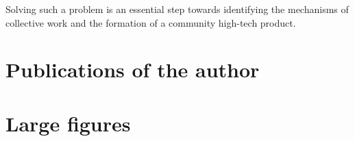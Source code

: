 \documentclass[12pt]{report}
\theoremstyle{definition}
\begin{document}
Solving such a problem is an essential step towards identifying the mechanisms of collective work and the formation of a community high-tech product.

\printbibliography

\part*{Publications of the author}

\begin{refsection}[authorpapersVAK]
	\nocite{*}
	\printbibliography[title={Publication in HAC editions.}]
\end{refsection}

\begin{refsection}[authorsvid]
	\nocite{*}
	\printbibliography[title={Patents.}]
\end{refsection}

\begin{refsection}[authorconferences]
	\nocite{*}
	\printbibliography[title={Proceedings.}]
\end{refsection}

\begin{refsection}[authorpapers]
	\nocite{*}
	\printbibliography[title={Publications in peer-reviewed journals.}]
\end{refsection}



\appendix

\part*{Large figures}
\end{document}
